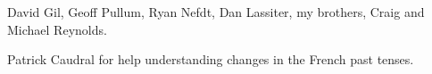 \addchap{\lsAcknowledgementTitle} 

David Gil, Geoff Pullum, Ryan Nefdt, Dan Lassiter, my brothers, Craig and Michael Reynolds.

Patrick Caudral for help understanding changes in the French past tenses.